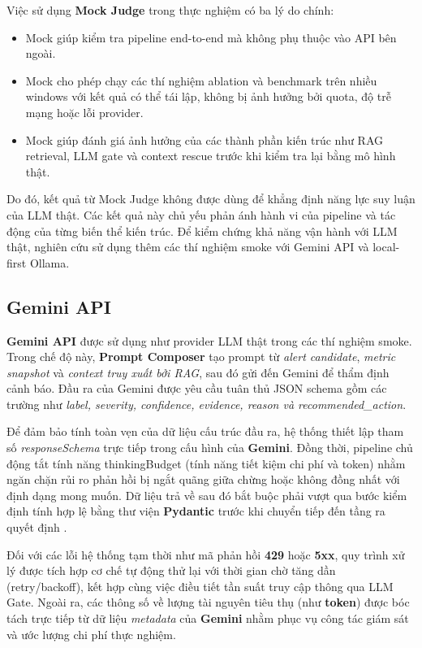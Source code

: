 Việc sử dụng \textbf{Mock Judge} trong thực nghiệm có ba lý do chính:
\begin{itemize}[label=--]
    \item Mock giúp kiểm tra pipeline end-to-end mà không phụ thuộc vào API bên ngoài.
    \item Mock cho phép chạy các thí nghiệm ablation và benchmark trên nhiều windows với kết quả có thể tái lập, không bị ảnh hưởng bởi quota, độ trễ mạng hoặc lỗi provider.
    \item Mock giúp đánh giá ảnh hưởng của các thành phần kiến trúc như RAG retrieval, LLM gate và context rescue trước khi kiểm tra lại bằng mô hình thật.
\end{itemize}
Do đó, kết quả từ Mock Judge không được dùng để khẳng định năng lực suy luận của LLM thật. Các kết quả này chủ yếu phản ánh hành vi của pipeline và tác động của từng biến thể kiến trúc. Để kiểm chứng khả năng vận hành với LLM thật, nghiên cứu sử dụng thêm các thí nghiệm smoke với Gemini API và local-first Ollama.
\subsection*{Gemini API}

\textbf{Gemini API} được sử dụng như provider LLM thật trong các thí nghiệm smoke. Trong chế độ này, \textbf{Prompt Composer} tạo prompt từ \textit{alert candidate}, \textit{metric snapshot} và \textit{context truy xuất bởi RAG}, sau đó gửi đến Gemini để thẩm định cảnh báo. Đầu ra của Gemini được yêu cầu tuân thủ JSON schema gồm các trường như \textit{label, severity, confidence, evidence, reason và recommended\_action}.

Để đảm bảo tính toàn vẹn của dữ liệu cấu trúc đầu ra, hệ thống thiết lập tham số \textit{responseSchema} trực tiếp trong cấu hình của \textbf{Gemini}. Đồng thời, pipeline chủ động tắt tính năng thinkingBudget (tính năng tiết kiệm chi phí và token) nhằm ngăn chặn rủi ro phản hồi bị ngắt quãng giữa chừng hoặc không đồng nhất với định dạng mong muốn. Dữ liệu trả về sau đó bắt buộc phải vượt qua bước kiểm định tính hợp lệ bằng thư viện \textbf{Pydantic }trước khi chuyển tiếp đến tầng ra quyết định .

Đối với các lỗi hệ thống tạm thời như mã phản hồi \textbf{429 }hoặc \textbf{5xx}, quy trình xử lý được tích hợp cơ chế tự động thử lại với thời gian chờ tăng dần (retry/backoff), kết hợp cùng việc điều tiết tần suất truy cập thông qua LLM Gate. Ngoài ra, các thông số về lượng tài nguyên tiêu thụ (như \textbf{token}) được bóc tách trực tiếp từ dữ liệu \textit{metadata} của \textbf{Gemini} nhằm phục vụ công tác giám sát và ước lượng chi phí thực nghiệm.

